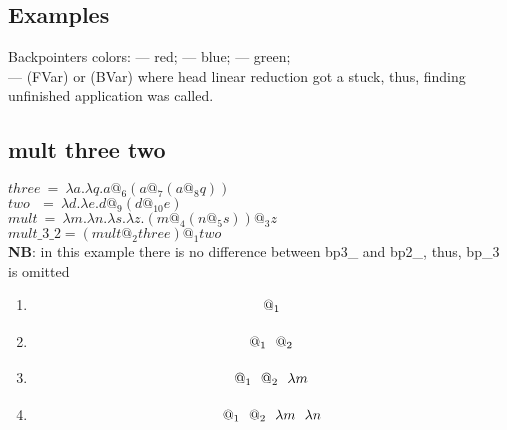 \documentclass[a4paper, 12pt]{article} %
\newcommand{\tikzmark}[3][]{\tikz[remember picture,baseline] \node [inner xsep=0pt,anchor=base,#1](#2) {#3};}
\begin{document}
\begin{landscape}

\section{Examples}
Backpointers colors: {\color{red}{bp2}} --- red; {\color{blue}{bp3}} --- blue; {\color{green}{bp4}} --- green;\\
{\color{blue}{Blue tokens}} --- (FVar) or (BVar) where head linear reduction got a stuck, thus, finding unfinished application was called.

\subsection{mult three two}
$three\ =\ \lambda a . \lambda q . a @_6 (a @_7 (a @_8 q))$\\
$two\ \ \ =\ \lambda d . \lambda e . d @_9 (d @_10 e)$\\
$mult\ =\ \lambda m . \lambda n . \lambda s . \lambda z . (m @_4 (n @_5 s)) @_3 z$\\
$mult\_3\_2 = (mult @_2 three) @_1 two$\\
\textbf{NB}: in this example there is no difference between bp3\_ and bp2\_, thus, bp\_3 is omitted
\begin{enumerate}
\item
\[\tikzmark{1}{$@_1$}\]
\item
\[\tikzmark{1}{$@_1$}\ \ \tikzmark{2}{$@_2$}\]
\item
\[\tikzmark{1}{$@_1$}\ \ \tikzmark{2}{$@_2$}\ \ \tikzmark{3}{$\lambda m$}\]
\item
\[\tikzmark{1}{$@_1$}\ \ \tikzmark{2}{$@_2$}\ \ \tikzmark{3}{$\lambda m$}\ \ \tikzmark{4}{$\lambda n$}\]
\end{enumerate}
\end{landscape}
\end{document}
